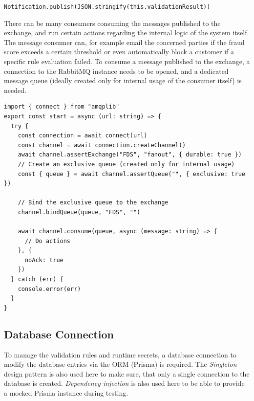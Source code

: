     \begin{lstlisting}[style=es6, caption={Publishing a validation result to the RabbitMQ exchange (TypeScript)}]
Notification.publish(JSON.stringify(this.validationResult))
    \end{lstlisting}
    
    There can be many consumers consuming the messages published to the exchange, and run certain actions regarding the internal logic of the system itself. The message consumer can, for example email the concerned parties if the fraud score exceeds a certain threshold or even automatically block a customer if a specific rule evaluation failed. To consume a message published to the exchange, a connection to the RabbitMQ instance needs to be opened, and a dedicated message queue (ideally created only for internal usage of the consumer itself) is needed. 

    \newpage
    \begin{lstlisting}[style=es6, caption={Consuming a message published to the RabbitMQ exchange (TypeScript)}]
import { connect } from "amqplib"
export const start = async (url: string) => {
  try {
    const connection = await connect(url)
    const channel = await connection.createChannel()
    await channel.assertExchange("FDS", "fanout", { durable: true })
    // Create an exclusive queue (created only for internal usage)
    const { queue } = await channel.assertQueue("", { exclusive: true })

    // Bind the exclusive queue to the exchange
    channel.bindQueue(queue, "FDS", "") 

    await channel.consume(queue, async (message: string) => {
      // Do actions
    }, {
      noAck: true
    })
  } catch (err) {
    console.error(err)
  }
}
    \end{lstlisting}

  \subsection{Database Connection}
  
    To manage the validation rules and runtime secrets, a database connection to modify the database entries via the ORM (Prisma) is required. The \emph{Singleton} \autocite[pp. 127-134]{gamma-1995} design pattern is also used here to make sure, that only a single connection to the database is created. \emph{Dependency injection} is also used here to be able to provide a mocked Prisma instance during testing. 

